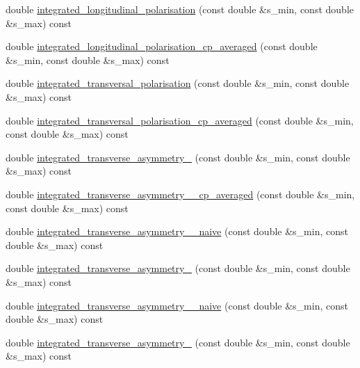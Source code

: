 \begin{DoxyCompactItemize}
\item 
double \hyperlink{classeos_1_1BToKstarDilepton_3_01LowRecoil_01_4_a209fd5571fe2d963a7fcdffb50402253}{integrated\_\-longitudinal\_\-polarisation} (const double \&s\_\-min, const double \&s\_\-max) const 
\item 
double \hyperlink{classeos_1_1BToKstarDilepton_3_01LowRecoil_01_4_a5a45dcc1284d1372f652af3a9ad1e168}{integrated\_\-longitudinal\_\-polarisation\_\-cp\_\-averaged} (const double \&s\_\-min, const double \&s\_\-max) const 
\item 
double \hyperlink{classeos_1_1BToKstarDilepton_3_01LowRecoil_01_4_af15faa28564c5a6a6c0e5905255fb8e7}{integrated\_\-transversal\_\-polarisation} (const double \&s\_\-min, const double \&s\_\-max) const 
\item 
double \hyperlink{classeos_1_1BToKstarDilepton_3_01LowRecoil_01_4_af13d5f75efad6b3cf81975395aabc447}{integrated\_\-transversal\_\-polarisation\_\-cp\_\-averaged} (const double \&s\_\-min, const double \&s\_\-max) const 
\item 
double \hyperlink{classeos_1_1BToKstarDilepton_3_01LowRecoil_01_4_a4ff995b9a1131833ed198b7735be882a}{integrated\_\-transverse\_\-asymmetry\_} (const double \&s\_\-min, const double \&s\_\-max) const 
\item 
double \hyperlink{classeos_1_1BToKstarDilepton_3_01LowRecoil_01_4_a871b934798288f80764e1ea4b5f74110}{integrated\_\-transverse\_\-asymmetry\_\_\-cp\_\-averaged} (const double \&s\_\-min, const double \&s\_\-max) const 
\item 
double \hyperlink{classeos_1_1BToKstarDilepton_3_01LowRecoil_01_4_a0fd4a54246acdea45c7bf8022ed2b8b4}{integrated\_\-transverse\_\-asymmetry\_\_\-naive} (const double \&s\_\-min, const double \&s\_\-max) const 
\item 
double \hyperlink{classeos_1_1BToKstarDilepton_3_01LowRecoil_01_4_ac72f802ae9d30f8acb2e229851956795}{integrated\_\-transverse\_\-asymmetry\_} (const double \&s\_\-min, const double \&s\_\-max) const 
\item 
double \hyperlink{classeos_1_1BToKstarDilepton_3_01LowRecoil_01_4_a365d7cf15da41dfe34c5edb16df2c812}{integrated\_\-transverse\_\-asymmetry\_\_\-naive} (const double \&s\_\-min, const double \&s\_\-max) const 
\item 
double \hyperlink{classeos_1_1BToKstarDilepton_3_01LowRecoil_01_4_a8986125c667918ce8d4a15e67c592c68}{integrated\_\-transverse\_\-asymmetry\_} (const double \&s\_\-min, const double \&s\_\-max) const 
\item 

\end{DoxyCompactItemize}
